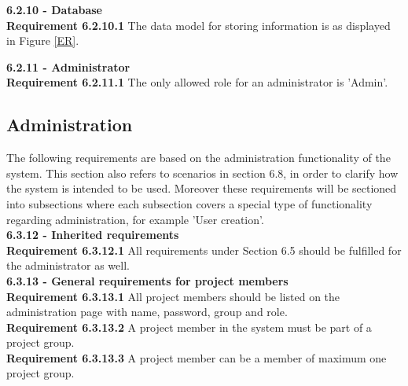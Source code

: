\documentclass{article}
\begin{document}
{\fontsize{11}{11}\selectfont \noindent\textbf{6.2.10 - Database}} \\
\textbf{Requirement 6.2.10.1} The data model for storing information is as displayed in Figure \ref{ER}.\\
\addtocounter{dataReq}{1}

{\fontsize{11}{11}\selectfont \noindent\textbf{6.2.11 - Administrator}} \\
\textbf{Requirement 6.2.11.1} The only allowed role for an administrator is 'Admin'.



\subsection{Administration}
The following requirements are based on the administration functionality of the system. This section also refers to scenarios in section 6.8, in order to clarify how the system is intended to be used. Moreover these requirements will be sectioned into subsections where each subsection covers a special type of functionality regarding administration, for example 'User creation'. \\

{\fontsize{11}{11}\selectfont \noindent\textbf{6.3.12 - Inherited requirements}} \\
\noindent\textbf{Requirement 6.3.12.1} All requirements under Section 6.5 should be fulfilled for the administrator as well.\\

{\fontsize{11}{11}\selectfont \noindent\textbf{6.3.13 - General requirements for project members}} \\
\noindent\textbf{Requirement 6.3.13.1} All project members should be listed on the administration page with name, password, group and role. \\
\textbf{Requirement 6.3.13.2} A project member in the system must be part of a project group. \\
\textbf{Requirement 6.3.13.3} A project member can be a member of maximum one project group. \\
\end{document}
